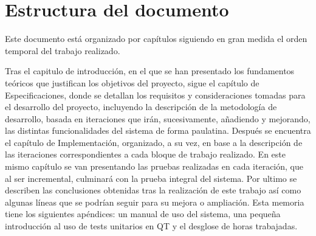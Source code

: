\section{Estructura del documento}
Este documento está organizado por capítulos siguiendo en gran medida el orden temporal del trabajo realizado. 

Tras el capitulo de introducción, en el que se han presentado los fundamentos teóricos que justifican los objetivos del proyecto, sigue el capítulo de Especificaciones, donde se detallan los requisitos y consideraciones tomadas para el desarrollo del proyecto, incluyendo la descripción de la metodología de desarrollo, basada en iteraciones que irán, sucesivamente, añadiendo y mejorando, las distintas funcionalidades del sistema de forma paulatina. Después se encuentra el capítulo de Implementación, organizado, a su vez, en base a la descripción de las iteraciones correspondientes a cada bloque de trabajo realizado. En este mismo capítulo se van presentando las pruebas realizadas en cada iteración, que al ser incremental, culminará con la prueba integral del sistema. Por ultimo se describen las conclusiones obtenidas tras la realización de este trabajo así como algunas líneas que se podrían seguir para su mejora o ampliación. Esta memoria tiene los siguientes apéndices: un manual de uso del sistema, una pequeña introducción al uso de tests unitarios en QT y el desglose de horas trabajadas.

\chapterend
